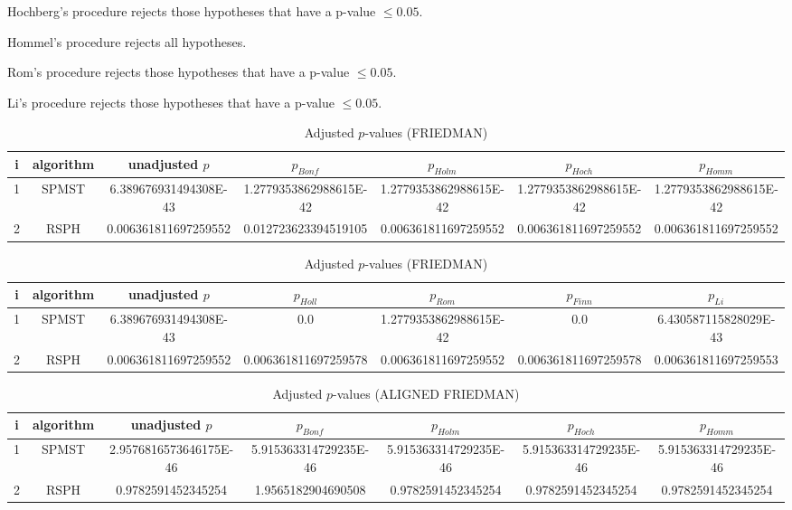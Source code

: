 \documentclass[a4paper,10pt]{article}
\begin{document}
\begin{landscape}
Hochberg's procedure rejects those hypotheses that have a p-value $\le0.05$.


Hommel's procedure rejects all hypotheses.


Rom's procedure rejects those hypotheses that have a p-value $\le0.05$.


Li's procedure rejects those hypotheses that have a p-value $\le0.05$.



\newpage

\begin{table}[!htp]
\centering\scriptsize
\caption{Adjusted $p$-values (FRIEDMAN)}
\begin{tabular}{ccccccc}
i&algorithm&unadjusted $p$&$p_{Bonf}$&$p_{Holm}$&$p_{Hoch}$&$p_{Homm}$\\
\hline
1&SPMST&6.389676931494308E-43&1.2779353862988615E-42&1.2779353862988615E-42&1.2779353862988615E-42&1.2779353862988615E-42\\
2&RSPH&0.006361811697259552&0.012723623394519105&0.006361811697259552&0.006361811697259552&0.006361811697259552\\
\hline
\end{tabular}
\end{table}

\begin{table}[!htp]
\centering\scriptsize
\caption{Adjusted $p$-values (FRIEDMAN)}
\begin{tabular}{ccccccc}
i&algorithm&unadjusted $p$&$p_{Holl}$&$p_{Rom}$&$p_{Finn}$&$p_{Li}$\\
\hline
1&SPMST&6.389676931494308E-43&0.0&1.2779353862988615E-42&0.0&6.430587115828029E-43\\
2&RSPH&0.006361811697259552&0.006361811697259578&0.006361811697259552&0.006361811697259578&0.006361811697259553\\
\hline
\end{tabular}
\end{table}


\newpage

\begin{table}[!htp]
\centering\scriptsize
\caption{Adjusted $p$-values (ALIGNED FRIEDMAN)}
\begin{tabular}{ccccccc}
i&algorithm&unadjusted $p$&$p_{Bonf}$&$p_{Holm}$&$p_{Hoch}$&$p_{Homm}$\\
\hline
1&SPMST&2.9576816573646175E-46&5.915363314729235E-46&5.915363314729235E-46&5.915363314729235E-46&5.915363314729235E-46\\
2&RSPH&0.9782591452345254&1.9565182904690508&0.9782591452345254&0.9782591452345254&0.9782591452345254\\
\hline
\end{tabular}
\end{table}


\end{landscape}
\end{document}
